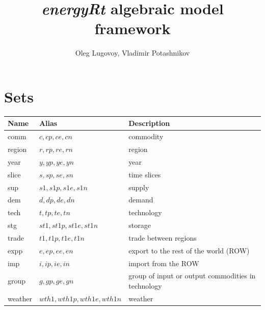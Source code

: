 \documentclass{article}
\title{\emph{energyRt} algebraic model framework}
\author{Oleg Lugovoy, Vladimir Potashnikov}
\begin{document}
\maketitle
\section*{Sets}
\begin{longtable}{| l | l | l |}
\hline
\bf{Name} & \bf{Alias} & \bf{Description} \\ 
 \hline
comm & $c,cp,ce,cn$ & commodity \\ 
 \hline
region & $r,rp,re,rn$ & region \\ 
 \hline
year & $y,yp,ye,yn$ & year \\ 
 \hline
slice & $s,sp,se,sn$ & time slices \\ 
 \hline
sup & $s1,s1p,s1e,s1n$ & supply \\ 
 \hline
dem & $d,dp,de,dn$ & demand \\ 
 \hline
tech & $t,tp,te,tn$ & technology \\ 
 \hline
stg & $st1,st1p,st1e,st1n$ & storage \\ 
 \hline
trade & $t1,t1p,t1e,t1n$ & trade between regions \\ 
 \hline
expp & $e,ep,ee,en$ & export to the rest of the world (ROW) \\ 
 \hline
imp & $i,ip,ie,in$ & import from the ROW \\ 
 \hline
group & $g,gp,ge,gn$ & group of input or output commodities in technology \\ 
 \hline
weather & $wth1,wth1p,wth1e,wth1n$ & weather \\ 
 \hline
\end{longtable}
\end{document}
